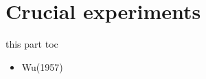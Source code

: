 \documentclass[10pt,xcolor={usenames},fleqn,mathserif,serif]{beamer}
\begin{document}
\part{Crucial experiments}
\frame{\partpage}
\begin{frame}{this part toc}
\begin{itemize}
\item Wu(1957)
\end{itemize}
\end{frame}

\end{document}
